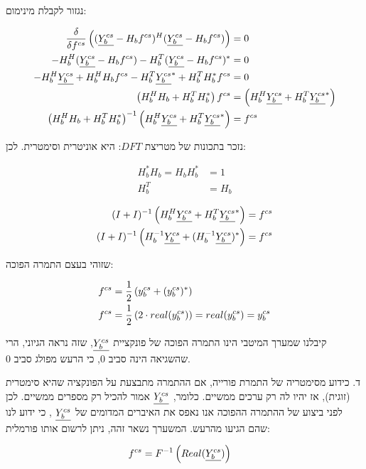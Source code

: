 \documentclass[a4paper]{iacas}
\begin{document}
\begin{hebrew}
נגזור לקבלת מינימום:
\end{hebrew}
\begin{align*}
\frac{\delta}{\delta f^{cs}}\left((\underline{Y_b^{cs}}-H_{b}f^{cs})^{H}(\underline{Y_b^{cs}}-H_{b}f^{cs})\right)  &= 0 \\ 
-H_{b}^{H}(\underline{Y_b^{cs}}-H_{b}f^{cs})-H_{b}^{T}(\underline{Y_b^{cs}}-H_{b}f^{cs})^{*} &= 0 \\ 
-H_{b}^{H}\underline{Y_b^{cs}}+H_{b}^{H}H_{b}f^{cs}-H_{b}^{T}\underline{Y_b^{cs}}^{*}+H_{b}^{T}H_{b}^{*}f^{cs} &= 0 \\
\left(H_{b}^{H}H_{b}+H_{b}^{T}H_{b}^{*}\right)f^{cs} &= \left(H_{b}^{H}\underline{Y_b^{cs}}+H_{b}^{T}\underline{Y_b^{cs}}^{*}\right) \\
\left(H_{b}^{H}H_{b}+H_{b}^{T}H_{b}^{*}\right)^{-1}\left(H_{b}^{H}\underline{Y_b^{cs}}+H_{b}^{T}\underline{Y_b^{cs}}^{*}\right) &= f^{cs}
\end{align*}
\begin{hebrew}
נזכר בתכונות של מטריצת $DFT$: היא אוניטרית וסימטרית. לכן:
\end{hebrew}
\begin{align*}
H_{b}^{*}H_{b} = H_{b}H_{b}^{*}  &= 1 \\
H_{b}^{T} &= H_{b}
\end{align*}

\begin{align*}
(I+I)^{-1}\left(H_{b}^{H}\underline{Y_b^{cs}}+H_{b}^{T}\underline{Y_b^{cs}}^{*}\right) &= f^{cs} \\
(I+I)^{-1}\left(H_{b}^{-1}\underline{Y_b^{cs}}+(H_{b}^{-1}\underline{Y_b^{cs}})^{*}\right) &= f^{cs}
\end{align*}
\begin{hebrew}
שזוהי בעצם התמרה הפוכה:
\end{hebrew}
\begin{align*}
f^{cs} &= \frac{1}{2}\left(y_{b}^{cs} + (y_{b}^{cs})^{*}\right) \\ 
f^{cs} &= \frac{1}{2}\left(2\cdot real(y_{b}^{cs})\right)= real(y_{b}^{cs}) = y_{b}^{cs}
\end{align*}

\begin{hebrew}
קיבלנו שמערך המיטבי הינו התמרה הפוכה של פונקציית $\underline{Y_b^{cs}}$, שזה נראה הגיוני, הרי שהשגיאה הינה סביב 0, כי הרעש מפולג סביב 0. 
\end{hebrew}

\begin{hebrew}
ד. כידוע מסימטריה של התמרת פורייה, אם ההתמרה מתבצעת על הפונקציה שהיא סימטרית (זוגית), אז יהיו לה רק ערכים ממשיים. כלומר, $\underline{Y_b^{cs}}$ אמור להכיל רק מספרים ממשיים. לכן לפני ביצוע של ההתמרה ההפוכה אנו נאפס את האיברים המדומים של $\underline{Y_b^{cs}}$ , כי ידוע לנו שהם הגיעו מהרעש. המשערך נשאר זהה, ניתן לרשום אותו פורמלית:
\end{hebrew}
\begin{align*}
f^{cs} &= F^{-1}\left(Real(\underline{Y_b^{cs}})\right)
\end{align*}
\end{document}
